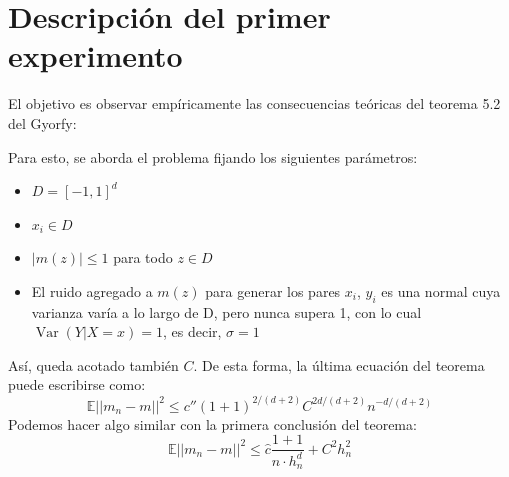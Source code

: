 \documentclass[12pt, a4paper]{article}
\begin{document}
\section{Descripción del primer experimento}
El objetivo es observar empíricamente las consecuencias teóricas del teorema 5.2 del Gyorfy:

Para esto, se aborda el problema fijando los siguientes parámetros:
\begin{itemize}
  \item $D=[-1,1]^d$
  \item $ x_i \in D$
  \item $|m(z)|\leq 1 $ para todo $z\in D$
  \item El ruido agregado a $m(z)$ para generar los pares $x_i$, $y_i$ es una normal cuya varianza varía a lo largo de D, pero nunca supera 1, con lo cual $\mathop{Var}(Y|X=x) = 1$, es decir, $\sigma=1$
\end{itemize}

Así, queda acotado también $C$. De esta forma, la última ecuación del teorema puede escribirse como:
$$
\mathds{E}||m_n - m||^2 \leq c'' (1+1)^{2/(d+2)} C^{2d/(d+2)} n^{-d/(d+2)}
$$
Podemos hacer algo similar con la primera conclusión del teorema:
$$
\mathds{E}|| m_n -m ||^2 \leq \hat{c} \dfrac{ 1 + 1 }{n \cdot h_n^d} +C^2h_n^2
$$
\end{document}
